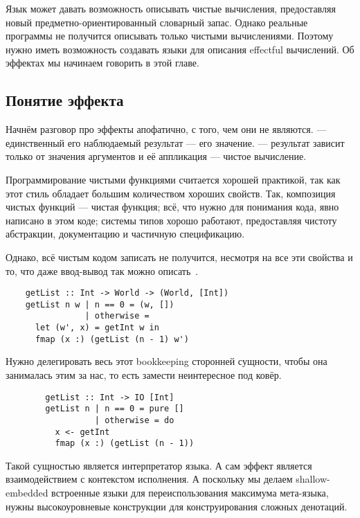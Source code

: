 
Язык может давать возможность описывать чистые вычисления, предоставляя новый предметно-ориентированный словарный запас.
Однако реальные программы не получится описывать только чистыми вычислениями.
Поэтому нужно иметь возможность создавать языки для описания effectful вычислений.
Об эффектах мы начинаем говорить в этой главе.

\subsection{Понятие эффекта}

Начнём разговор про эффекты апофатично, с того, чем они не являются.
 --- единственный его наблюдаемый результат --- его значение.
 --- результат зависит только от значения аргументов и её аппликация --- чистое вычисление.

Программирование чистыми функциями считается хорошей практикой, так как этот стиль обладает большим количеством хороших свойств.
Так, композиция чистых функций --- чистая функция; всё, что нужно для понимания кода, явно написано в этом коде; системы типов хорошо работают, предоставляя чистоту абстракции, документацию и частичную спецификацию.

Однако, всё чистым кодом записать не получится, несмотря на все эти свойства и то, что даже ввод-вывод так можно описать~\cite{jones2001tackling}.
\begin{verbatim}
    getList :: Int -> World -> (World, [Int])
    getList n w | n == 0 = (w, [])
                | otherwise =
      let (w', x) = getInt w in
      fmap (x :) (getList (n - 1) w')
\end{verbatim}

Нужно делегировать весь этот bookkeeping сторонней сущности, чтобы она занималась этим за нас, то есть замести неинтересное под ковёр. %

\begin{verbatim}
        getList :: Int -> IO [Int]
        getList n | n == 0 = pure []
                  | otherwise = do
          x <- getInt
          fmap (x :) (getList (n - 1))
\end{verbatim}

Такой сущностью является интерпретатор языка.
А сам эффект является взаимодействием с контекстом исполнения.
А поскольку мы делаем shallow-embedded встроенные языки для переиспользования максимума мета-языка, нужны высокоуровневые конструкции для конструирования сложных денотаций.

